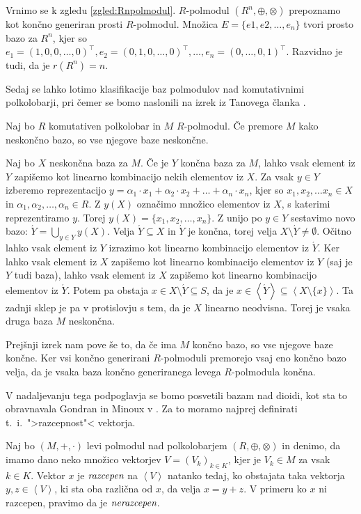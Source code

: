 \documentclass[mat1]{fmfdelo}
\newcommand{\pojem}[1]{\ensuremath{\emph{#1}}}
\newcommand{\Gen}[1]{\ensuremath{\left<{#1}\right>}}
\begin{document}
\begin{zgled}
	Vrnimo se k zgledu \ref{zgled:Rnpolmodul}. $R$-polmodul $(R^n, \oplus, \otimes)$ prepoznamo kot končno generiran prosti $R$-polmodul. Množica $E = \{e1, e2, \ldots, e_n\}$ tvori prosto bazo za $R^n$, kjer so $e_1 = (1, 0, 0, \ldots, 0)^\top, e_2 = (0, 1, 0, \ldots, 0)^\top, \ldots, e_n = (0, \ldots, 0, 1)^\top$. Razvidno je tudi, da je $r(R^n) = n$.
\end{zgled}

Sedaj se lahko lotimo klasifikacije baz polmodulov nad komutativnimi polkolobarji, pri čemer se bomo naslonili na izrek iz Tanovega članka \cite[izrek 3.\,1.\,]{bib:Tanbase}.

\begin{izrek}
	Naj bo $R$ komutativen polkolobar in $M$ $R$-polmodul. Če premore $M$ kako neskončno bazo, so vse njegove baze neskončne.
\end{izrek}
\begin{dokaz}
	Naj bo $X$ neskončna baza za $M$. Če je $Y$ končna baza za $M$, lahko vsak element iz $Y$ zapišemo kot linearno kombinacijo nekih elementov iz $X$. Za vsak $y\in Y$ izberemo reprezentacijo $y = \alpha_1\cdot x_1 + \alpha_2\cdot x_2 + \ldots + \alpha_n\cdot x_n$, kjer so $x_1, x_2, \ldots x_n \in X$ in $\alpha_1, \alpha_2, \ldots, \alpha_n \in R$. Z $y(X)$ označimo množico elementov iz $X$, s katerimi reprezentiramo $y$. Torej $y(X) = \{x_1, x_2, \ldots, x_n\}$. Z unijo po $y\in Y$ sestavimo novo bazo: $\acute{Y} = \bigcup_{y\in Y}y(X)$. Velja $\acute{Y} \subseteq X$ in $\acute{Y}$ je končna, torej velja $X\setminus\acute{Y}\neq\emptyset$. Očitno lahko vsak element iz $Y$ izrazimo kot linearno kombinacijo elementov iz $\acute{Y}$. Ker lahko vsak element iz $X$ zapišemo kot linearno kombinacijo elementov iz $Y$ (saj je $Y$ tudi baza), lahko vsak element iz $X$ zapišemo kot linearno kombinacijo elementov iz $\acute{Y}$. Potem pa obstaja $x\in X\setminus\acute{Y} \subseteq S$, da je $x\in \Gen{\acute{Y}}\subseteq\Gen{X\setminus\{x\}}$. Ta zadnji sklep je pa v protislovju s tem, da je $X$ linearno neodvisna. Torej je vsaka druga baza $M$ neskončna.
\end{dokaz}

	Prejšnji izrek nam pove še to, da če ima $M$ končno bazo, so vse njegove baze končne. Ker vsi končno generirani $R$-polmoduli premorejo vsaj eno končno bazo velja, da je vsaka baza končno generiranega levega $R$-polmodula končna.

V nadaljevanju tega podpoglavja se bomo posvetili bazam nad dioidi, kot sta to obravnavala Gondran in Minoux v \cite[poglavje 5.\,2.\,5.\,]{bib:Gondran}. Za to moramo najprej definirati t.~i.\ ">razcepnost"< vektorja.
\begin{definicija}
	Naj bo $(M, +,\cdot)$ levi polmodul nad polkolobarjem $(R, \oplus, \otimes)$ in denimo, da imamo dano neko množico vektorjev $V = (V_k)_{k\in K}$, kjer je $V_k\in M$ za vsak $k\in K$. Vektor $x$ je \pojem{razcepen} na \Gen{V} natanko tedaj, ko obstajata taka vektorja $y, z\in \Gen{V}$, ki sta oba različna od $x$, da velja $x = y + z$. V primeru ko $x$ ni razcepen, pravimo da je \pojem{nerazcepen}.
\end{definicija}
\end{document}
